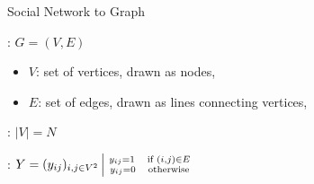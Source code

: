 \begin{frame}[t]{Social Network to Graph}


    \begin{description}[align]
        \item[A graph]: $G = (V,E)$
            \begin{itemize}
                \item $V$: set of vertices, drawn as nodes,
                \item $E$: set of edges, drawn as lines connecting vertices,
            \end{itemize}

        \item[containing $N$ nodes]:  $|V| = N$
        \item[Define a adjacency matrix]:  $Y=(y_{ij})_{i,j \in V^2} \left| \substack{\ y_{ij}=1 \quad \textrm{if } (i,j) \in E \\ \ y_{ij}=0 \quad \textrm{otherwise} } \right.\kern-\nulldelimiterspace  $
    \end{description}


\end{frame}
